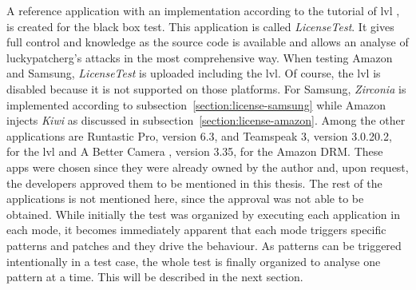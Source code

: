 A reference application with an implementation according to the tutorial of \gls{lvl} \cite{developersLicensingAdding}, is created for the black box test.
This application is called \textit{LicenseTest}.
It gives full control and knowledge as the source code is available and allows an analyse of \gls{luckypatcherg}’s attacks in the most comprehensive way.
When testing Amazon and Samsung, \textit{LicenseTest} is uploaded including the \gls{lvl}.
Of course,  the \gls{lvl} is disabled because it is not supported on those platforms.
For Samsung, \textit{Zirconia} is implemented according to subsection~\ref{section:license-samsung} while Amazon injects \textit{Kiwi} as discussed in subsection~\ref{section:license-amazon}.
Among the other applications are Runtastic Pro\cite{runtasticApp}, version 6.3, and Teamspeak 3\cite{teamspeakApp}, version 3.0.20.2, for the \gls{lvl} and A Better Camera \cite{abettercamera}, version 3.35, for the Amazon DRM.
These apps were chosen since they were already owned by the author and, upon request, the developers approved them to be mentioned in this thesis.
The rest of the applications is not mentioned here, since the approval was not able to be obtained.
\newline
While initially the test was organized by executing each application in each mode, it becomes immediately apparent that each mode triggers specific patterns and patches and they drive the behaviour.
As patterns can be triggered intentionally in a test case, the whole test is finally organized to analyse one pattern at a time.
This will be described in the next section.
